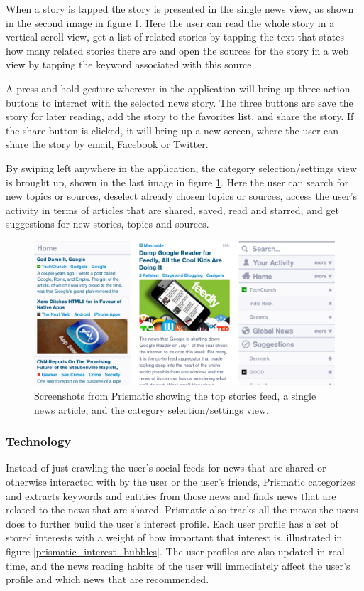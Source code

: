 When a story is tapped the story is presented in the single news view, as shown in the second image in figure \ref{screenshots_prismatic}. Here the user can read the whole story in a vertical scroll view, get a list of related stories by tapping the text that states how many related stories there are and open the sources for the story in a web view by tapping the keyword associated with this source. 

A press and hold gesture wherever in the application will bring up three action buttons to interact with the selected news story. The three buttons are save the story for later reading, add the story to the favorites list, and share the story. If the share button is clicked, it will bring up a new screen, where the user can share the story by email, Facebook or Twitter.

By swiping left anywhere in the application, the category selection/settings view is brought up, shown in the last image in figure \ref{screenshots_prismatic}. Here the user can search for new topics or sources, deselect already chosen topics or sources, access the user's activity in terms of articles that are shared, saved, read and starred, and get suggestions for new stories, topics and sources. 

\begin{figure}[!htbp]
\centering
\includegraphics[width=130mm]{GFX/screenshots/prismatic.png}
\caption{Screenshots from Prismatic showing the top stories feed, a single news article, and the category selection/settings view.}
\label{screenshots_prismatic}
\end{figure}

\subsubsection{Technology}
Instead of just crawling the user's social feeds for news that are shared or otherwise interacted with by the user or the user's friends, Prismatic categorizes and extracts keywords and entities from those news and finds news that are related to the news that are shared. Prismatic also tracks all the moves the users does to further build the user's interest profile. Each user profile has a set of stored interests with a weight of how important that interest is, illustrated in figure \ref{prismatic_interest_bubbles}. The user profiles are also updated in real time, and the news reading habits of the user will immediately affect the user's profile and which news that are recommended\cite{prismatic_how_it_works}.

